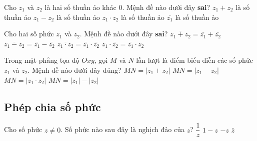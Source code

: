 \begin{ex}%
	Cho $z_1$ và $z_2$ là hai số thuần ảo khác $0$. Mệnh đề nào dưới đây \textbf{sai}? 
	\choice
	{$z_1+z_2$ là số thuần ảo}
	{$z_1-z_2$ là số thuần ảo}
	{\True $z_1\cdot z_2$ là số thuần ảo}
	{$\overline{z_1}$ là số thuần ảo}
\end{ex}

\begin{ex}%
	Cho hai số phức $z_1$ và $z_2$. Mệnh đề nào dưới đây \textbf{sai}?
	\choice
	{$\overline{z_1+z_2}=\overline{z_1}+\overline{z_2}$}
	{$\overline{z_1-z_2}=\overline{z_1}-\overline{z_2}$}
	{$\overline{z_1\cdot z_2}=\overline{z_1}\cdot \overline{z_2}$}
	{\True $z_1\cdot \overline{z_2}=\overline{z_1}\cdot z_2$}
\end{ex}

\begin{ex}%
	Trong mặt phẳng tọa độ $Oxy$, gọi $M$ và $N$ lần lượt là điểm biểu diễn các số phức $z_1$ và $z_2$. Mệnh đề nào dưới đây đúng?
	\choice
	{$MN=|z_1+z_2|$}
	{\True $MN=|z_1-z_2|$}
	{$MN=|z_1\cdot z_2|$}
	{$MN=|z_1|-|z_2|$}
\end{ex}
\subsection {Phép chia số phức}
\begin{ex}%
	Cho số phức $ z\neq 0 $. Số phức nào sau đây là  nghịch đảo của $ z $?
	\choice
	{\True $\dfrac{1}{z}$}
	{$1-z$}
	{$-z$}
	{$ \bar{z} $}
\end{ex}

